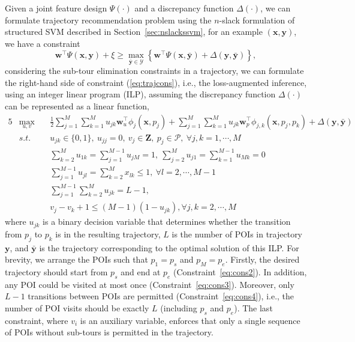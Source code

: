 \documentclass[9pt]{extarticle}
\begin{document}
Given a joint feature design $\Psi(\cdot)$ and a discrepancy function $\Delta(\cdot)$,
we can formulate trajectory recommendation problem using the $n$-slack formulation of structured SVM described in Section~\ref{sec:nslackssvm},
for an example $(\mathbf{x}, \mathbf{y})$, we have a constraint
\begin{equation}
\label{eq:trajcons}
\mathbf{w}^\top \Psi(\mathbf{x}, \mathbf{y}) + \xi \ge
          \max_{\bar{\mathbf{y}} \in \mathcal{Y}} 
          \left\{\mathbf{w}^\top \Psi(\mathbf{x}, \bar{\mathbf{y}}) + \Delta(\mathbf{y}, \bar{\mathbf{y}}) \right\},
\end{equation}
considering the sub-tour elimination constraints in a trajectory, we can formulate the right-hand side of constraint (\ref{eq:trajcons}), 
i.e., the loss-augmented inference,
using an integer linear program (ILP), assuming the discrepancy function $\Delta(\cdot)$ can be represented as a linear function, 
\begin{alignat}{5}
& \max_{u,v} ~&& \frac{1}{2} \sum_{j=1}^M \sum_{k=1}^M u_{jk} \mathbf{w}_u^\top \phi_j(\mathbf{x}, p_j) + 
                 \sum_{j=1}^M \sum_{k=1}^M u_{jk} \mathbf{w}_p^\top \phi_{j, k}(\mathbf{x}, p_j, p_k) + \Delta(\mathbf{y}, \bar{\mathbf{y}}) \\
& s.t. ~~ ~&& u_{jk} \in \{0, 1\}, ~u_{jj} = 0, ~v_j \in \mathbf{Z},~ p_j \in \mathcal{P}, ~\forall j, k = 1, \cdots, M    \label{eq:cons1} \\
&        && \sum_{k=2}^M u_{1k} = \sum_{j=1}^{M-1} u_{jM} = 1, ~\sum_{j=2}^M u_{j1} = \sum_{k=1}^{M-1} u_{Mk} = 0  \label{eq:cons2} \\
&        && \sum_{j=1}^{M-1} u_{jl} = \sum_{k=2}^M x_{lk} \le 1,   ~\forall l=2, \cdots, M-1                       \label{eq:cons3} \\
&        && \sum_{j=1}^{M-1} \sum_{k=2}^M u_{jk} = L-1,                                                            \label{eq:cons4} \\
&        && v_j - v_k + 1 \le (M-1) (1-u_{jk}),                     \forall j, k = 2, \cdots, M                    \label{eq:cons5}
\end{alignat}
where $u_{jk}$ is a binary decision variable that determines whether the transition from $p_j$ to $p_k$ is in the resulting trajectory,
$L$ is the number of POIs in trajectory $\mathbf{y}$, and $\bar{\mathbf{y}}$ is the trajectory corresponding to the optimal solution of this ILP.
For brevity, we arrange the POIs such that $p_1 = p_s$ and $p_M = p_e$.
Firstly, the desired trajectory should start from $p_s$ and end at $p_e$ (Constraint~\ref{eq:cons2}).
In addition, any POI could be visited at most once (Constraint~\ref{eq:cons3}).
Moreover, only $L-1$ transitions between POIs are permitted (Constraint~\ref{eq:cons4}),
i.e., the number of POI visits should be exactly $L$ (including $p_s$ and $p_e$).
The last constraint, where $v_i$ is an auxiliary variable,
enforces that only a single sequence of POIs without sub-tours is permitted in the trajectory.
\end{document}
